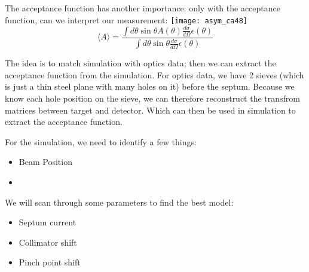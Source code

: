 The acceptance function has another importance: only with the acceptance
function, can we interpret our measurement:
\texttt{[image: asym\_ca48]}
\begin{equation*}
    \langle A \rangle = \frac{\int d\theta \sin\theta A(\theta) \frac{d\sigma}{d\Omega} \epsilon(\theta)}{\int d\theta \sin\theta \frac{d\sigma}{d\Omega} \epsilon(\theta)}
\end{equation*}

The idea is to match simulation with optics data; then we can extract the 
acceptance function from the simulation. For optics data, we have 2 sieves
(which is just a thin steel plane with many holes on it) before the septum.
Because we know each hole position on the sieve, we can therefore reconstruct
the transfrom matrices between target and detector. Which can then be used in
simulation to extract the acceptance function.

For the simulation, we need to identify a few things:
\begin{itemize}
    \item Beam Position
    \item 
\end{itemize}

We will scan through some parameters to find the best model:
\begin{itemize}
    \item Septum current
    \item Collimator shift
    \item Pinch point shift
\end{itemize}


